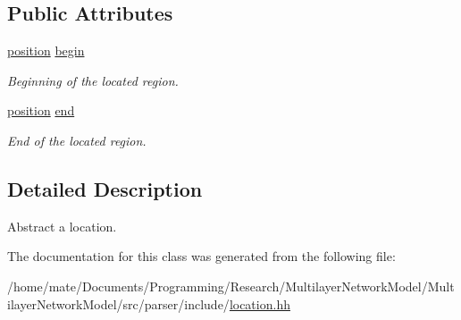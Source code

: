 \subsection*{Public Attributes}
\begin{DoxyCompactItemize}
\item 
\hyperlink{classEzAquarii_1_1position}{position} \hyperlink{classEzAquarii_1_1location_a44a3986e4a47d2e1a42b6d4ef4d325a7}{begin}\hypertarget{classEzAquarii_1_1location_a44a3986e4a47d2e1a42b6d4ef4d325a7}{}\label{classEzAquarii_1_1location_a44a3986e4a47d2e1a42b6d4ef4d325a7}

\begin{DoxyCompactList}\small\item\em Beginning of the located region. \end{DoxyCompactList}\item 
\hyperlink{classEzAquarii_1_1position}{position} \hyperlink{classEzAquarii_1_1location_acc6895050d9a3a5de820d0b482d9baf0}{end}\hypertarget{classEzAquarii_1_1location_acc6895050d9a3a5de820d0b482d9baf0}{}\label{classEzAquarii_1_1location_acc6895050d9a3a5de820d0b482d9baf0}

\begin{DoxyCompactList}\small\item\em End of the located region. \end{DoxyCompactList}\end{DoxyCompactItemize}


\subsection{Detailed Description}
Abstract a location. 

The documentation for this class was generated from the following file\+:\begin{DoxyCompactItemize}
\item 
/home/mate/\+Documents/\+Programming/\+Research/\+Multilayer\+Network\+Model/\+Multilayer\+Network\+Model/src/parser/include/\hyperlink{location_8hh}{location.\+hh}\end{DoxyCompactItemize}
